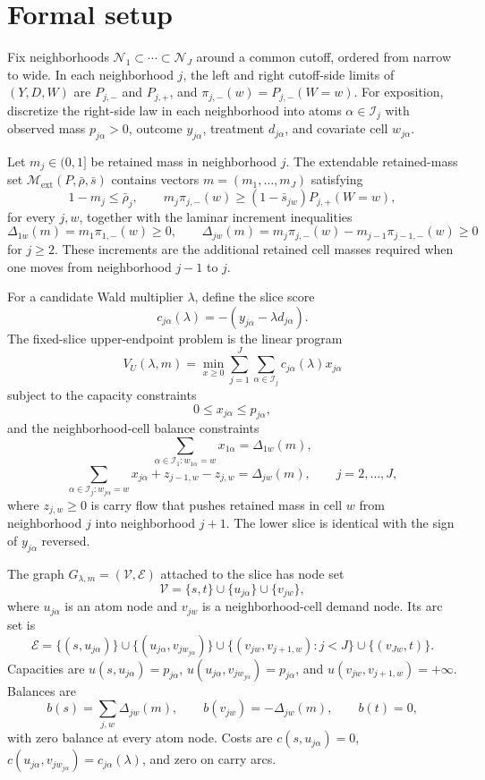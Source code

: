 \documentclass[11pt]{article}
\newcommand{\calM}{\mathcal{M}}
\newcommand{\calV}{\mathcal{V}}
\newcommand{\calE}{\mathcal{E}}
\theoremstyle{definition}
\theoremstyle{plain}
\theoremstyle{remark}
\begin{document}
\section{Formal setup}
Fix neighborhoods \(\mathcal N_1\subset\cdots\subset\mathcal N_J\) around a common cutoff,
ordered from narrow to wide. In each neighborhood \(j\), the left and right cutoff-side
limits of \((Y,D,W)\) are \(P_{j,-}\) and \(P_{j,+}\), and
\(\pi_{j,-}(w)=P_{j,-}(W=w)\). For exposition, discretize the right-side law in each
neighborhood into atoms \(\alpha\in\mathcal I_j\) with observed mass \(p_{j\alpha}>0\),
outcome \(y_{j\alpha}\), treatment \(d_{j\alpha}\), and covariate cell \(w_{j\alpha}\).

Let \(m_j\in(0,1]\) be retained mass in neighborhood \(j\). The extendable retained-mass
set \(\calM_{\mathrm{ext}}(P,\bar\rho,\bar s)\) contains vectors \(m=(m_1,\ldots,m_J)\)
satisfying
\[
1-m_j\le \bar\rho_j,\qquad
m_j\pi_{j,-}(w)\ge (1-\bar s_{jw})P_{j,+}(W=w),
\]
for every \(j,w\), together with the laminar increment inequalities
\[
\Delta_{1w}(m)=m_1\pi_{1,-}(w)\ge 0,\qquad
\Delta_{jw}(m)=m_j\pi_{j,-}(w)-m_{j-1}\pi_{j-1,-}(w)\ge 0
\]
for \(j\ge2\). These increments are the additional retained cell masses required when one
moves from neighborhood \(j-1\) to \(j\).

For a candidate Wald multiplier \(\lambda\), define the slice score
\[
c_{j\alpha}(\lambda)=-(y_{j\alpha}-\lambda d_{j\alpha}).
\]
The fixed-slice upper-endpoint problem is the linear program
\[
V_U(\lambda,m)=\min_{x\ge0}\sum_{j=1}^J\sum_{\alpha\in\mathcal I_j} c_{j\alpha}(\lambda)x_{j\alpha}
\]
subject to the capacity constraints
\[
0\le x_{j\alpha}\le p_{j\alpha},
\]
and the neighborhood-cell balance constraints
\[
\sum_{\alpha\in\mathcal I_1:w_{1\alpha}=w}x_{1\alpha}=\Delta_{1w}(m),
\]
\[
\sum_{\alpha\in\mathcal I_j:w_{j\alpha}=w}x_{j\alpha}
+z_{j-1,w}-z_{j,w}
=\Delta_{jw}(m),\qquad j=2,\ldots,J,
\]
where \(z_{j,w}\ge0\) is carry flow that pushes retained mass in cell \(w\) from
neighborhood \(j\) into neighborhood \(j+1\). The lower slice is identical with the sign
of \(y_{j\alpha}\) reversed.

The graph \(G_{\lambda,m}=(\calV,\calE)\) attached to the slice has node set
\[
\calV=\{s,t\}\cup\{u_{j\alpha}\}\cup\{v_{jw}\},
\]
where \(u_{j\alpha}\) is an atom node and \(v_{jw}\) is a neighborhood-cell demand node.
Its arc set is
\[
\calE=
\{(s,u_{j\alpha})\}\cup\{(u_{j\alpha},v_{jw_{j\alpha}})\}
\cup\{(v_{jw},v_{j+1,w}):j<J\}\cup\{(v_{Jw},t)\}.
\]
Capacities are \(u(s,u_{j\alpha})=p_{j\alpha}\), \(u(u_{j\alpha},v_{jw_{j\alpha}})=p_{j\alpha}\),
and \(u(v_{jw},v_{j+1,w})=+\infty\). Balances are
\[
b(s)=\sum_{j,w}\Delta_{jw}(m),\qquad b(v_{jw})=-\Delta_{jw}(m),\qquad b(t)=0,
\]
with zero balance at every atom node. Costs are \(c(s,u_{j\alpha})=0\),
\(c(u_{j\alpha},v_{jw_{j\alpha}})=c_{j\alpha}(\lambda)\), and zero on carry arcs.
\end{document}
